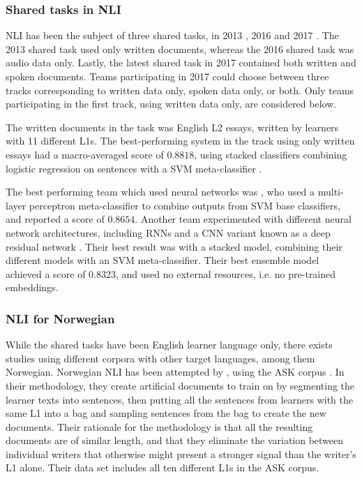 \subsubsection{Shared tasks in NLI}

\ac{NLI} has been the subject of three shared tasks, in 2013
\autocite{tetreault2013report}, 2016 \autocite{schuller2016interspeech} and
2017 \autocite{nli17}. The 2013 shared task used only written documents,
whereas the 2016 shared task was audio data only. Lastly, the latest shared
task in 2017 contained both written and spoken documents. Teams participating
in 2017 could choose between three tracks corresponding to written data only,
spoken data only, or both. Only teams participating in the first track, using
written data only, are considered below.

The written documents in the task was English L2 essays, written by learners
with 11 different L1s. The best-performing system in the track using only
written essays had a macro-averaged \FI score of $0.8818$, using stacked
classifiers combining logistic regression on sentences with a \ac{SVM}
meta-classifier \autocite{cimino17}.

The best performing team which used neural networks was \textcite{li17}, who
used a multi-layer perceptron meta-classifier to combine outputs from
\ac{SVM} base classifiers, and reported a \FI score of $0.8654$. Another team
experimented with different neural network architectures, including \acp{RNN}
and a \ac{CNN} variant known as a deep residual network
\autocite{bjerva2017neural}. Their best result was with a stacked model,
combining their different models with an \ac{SVM} meta-classifier. Their best
ensemble model achieved a \FI score of $0.8323$, and used no external
resources, i.e. no pre-trained embeddings.


\subsubsection{NLI for Norwegian}

While the shared tasks have been English learner language only, there exists
studies using different corpora with other target languages, among them
Norwegian. Norwegian \ac{NLI} has been attempted by \textcite{malmasi15},
using the ASK corpus \autocite{tenfjord06}. In their methodology, they create
artificial documents to train on by segmenting the learner texts into
sentences, then putting all the sentences from learners with the same L1 into
a bag and sampling sentences from the bag to create the new documents. Their
rationale for the methodology is that all the resulting documents are of
similar length, and that they eliminate the variation between individual
writers that otherwise might present a stronger signal than the writer's L1
alone. Their data set includes all ten different \acp{L1} in the ASK corpus.

